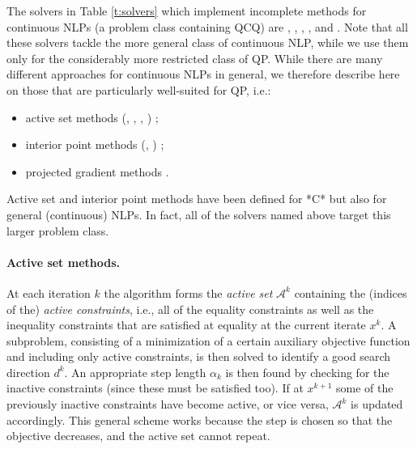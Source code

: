 The solvers in Table \ref{t:solvers} which implement incomplete methods for continuous NLPs (a problem class containing QCQ) are \conopt, \ipopt, \minos, \snopt, and \knitro. Note that all these solvers tackle the more general class of continuous NLP, while we use them only for the considerably more restricted class of QP. While there are many different approaches for continuous NLPs in general, we therefore describe here on those that are particularly well-suited for QP, i.e.:
%
\begin{itemize}
 \item active set methods (\conopt, \minos, \snopt, \knitro) \cite{Dost09};
 \item interior point methods (\ipopt, \knitro) \cite{Wright97};
 \item projected gradient methods \cite{CalaMore87:mp,ChenGui13:coap}.
\end{itemize}
%
Active set and interior point methods have been defined for *C* but also for general (continuous) NLPs. In fact, all of the solvers named above target this larger problem class.

\paragraph{Active set methods.}
%
At each iteration $k$ the algorithm forms the \emph{active set} $\mathcal{A}^k$ containing the (indices of the) \emph{active constraints}, i.e., all of the equality constraints as well as the inequality constraints that are satisfied at equality at the current iterate $x^k$. A subproblem, consisting of a minimization of a certain auxiliary objective function and including only active constraints, is then solved to identify a good search direction $d^k$. An appropriate step length $\alpha_k$ is then found by checking for the inactive constraints (since these must be satisfied too). If at $x^{k+1}$ some of the previously inactive constraints have become active, or vice versa, $\mathcal{A}^k$ is updated accordingly. This general scheme works because the step is chosen so that the objective decreases, and the active set cannot repeat.

